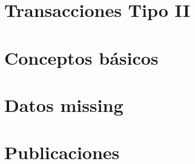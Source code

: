 




\section{Transacciones Tipo II}
\label{sec:catalogos:transacciones-tipo-ii}





\section{Conceptos básicos}
\label{sec:clasificacion:conceptos-basicos}





\section{\Catalogo}
\label{sec:clasificacion:catalogo}





\section{\CC}
\label{sec:clasificacion:catalogo-completo}





\section{Datos missing}
\label{sec:clasificacion:datos-missing}





\section{Publicaciones}
\label{sec:clasificacion:publicaciones}

